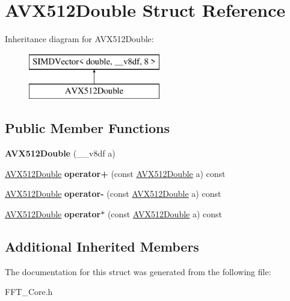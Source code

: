 \hypertarget{struct_a_v_x512_double}{}\section{A\+V\+X512\+Double Struct Reference}
\label{struct_a_v_x512_double}
Inheritance diagram for A\+V\+X512\+Double\+:\begin{figure}[H]
\begin{center}
\leavevmode
\includegraphics[height=2.000000cm]{struct_a_v_x512_double}
\end{center}
\end{figure}
\subsection*{Public Member Functions}
\begin{DoxyCompactItemize}
\item 
\mbox{\label{struct_a_v_x512_double_a8e174566aac629eb8e27233e2d2771b8}} 
{\bfseries A\+V\+X512\+Double} (\+\_\+\+\_\+v8df a)
\item 
\mbox{\label{struct_a_v_x512_double_ab30f26219d2f1bdab659862d461a7409}} 
\hyperlink{struct_a_v_x512_double}{A\+V\+X512\+Double} {\bfseries operator+} (const \hyperlink{struct_a_v_x512_double}{A\+V\+X512\+Double} a) const
\item 
\mbox{\label{struct_a_v_x512_double_a41595c707d0eab67e5df149402bbb5c7}} 
\hyperlink{struct_a_v_x512_double}{A\+V\+X512\+Double} {\bfseries operator-\/} (const \hyperlink{struct_a_v_x512_double}{A\+V\+X512\+Double} a) const
\item 
\mbox{\label{struct_a_v_x512_double_a4558b14fa9a058f63ce10e86e5d9b4a1}} 
\hyperlink{struct_a_v_x512_double}{A\+V\+X512\+Double} {\bfseries operator$\ast$} (const \hyperlink{struct_a_v_x512_double}{A\+V\+X512\+Double} a) const
\end{DoxyCompactItemize}
\subsection*{Additional Inherited Members}


The documentation for this struct was generated from the following file\+:\begin{DoxyCompactItemize}
\item 
F\+F\+T\+\_\+\+Core.\+h\end{DoxyCompactItemize}
